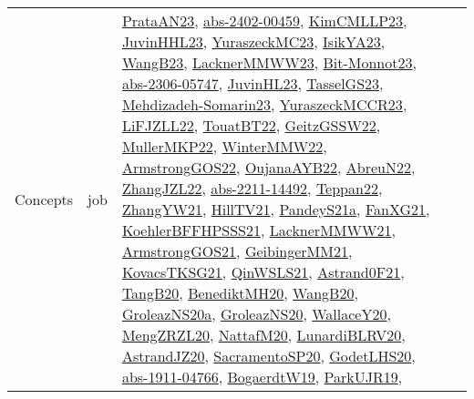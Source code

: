 {\begin{longtable}{lp{3cm}>{\raggedright}p{6cm}>{\raggedright}p{6cm}p{8cm}}
Concepts & job & \href{articles/PrataAN23.pdf}{PrataAN23}\cite{PrataAN23}, \href{articles/abs-2402-00459.pdf}{abs-2402-00459}\cite{abs-2402-00459}, \href{papers/KimCMLLP23.pdf}{KimCMLLP23}\cite{KimCMLLP23}, \href{papers/JuvinHHL23.pdf}{JuvinHHL23}\cite{JuvinHHL23}, \href{papers/YuraszeckMC23.pdf}{YuraszeckMC23}\cite{YuraszeckMC23}, \href{articles/IsikYA23.pdf}{IsikYA23}\cite{IsikYA23}, \href{papers/WangB23.pdf}{WangB23}\cite{WangB23}, \href{articles/LacknerMMWW23.pdf}{LacknerMMWW23}\cite{LacknerMMWW23}, \href{papers/Bit-Monnot23.pdf}{Bit-Monnot23}\cite{Bit-Monnot23}, \href{articles/abs-2306-05747.pdf}{abs-2306-05747}\cite{abs-2306-05747}, \href{papers/JuvinHL23.pdf}{JuvinHL23}\cite{JuvinHL23}, \href{papers/TasselGS23.pdf}{TasselGS23}\cite{TasselGS23}, \href{papers/Mehdizadeh-Somarin23.pdf}{Mehdizadeh-Somarin23}\cite{Mehdizadeh-Somarin23}, \href{articles/YuraszeckMCCR23.pdf}{YuraszeckMCCR23}\cite{YuraszeckMCCR23}, \href{papers/LiFJZLL22.pdf}{LiFJZLL22}\cite{LiFJZLL22}, \href{papers/TouatBT22.pdf}{TouatBT22}\cite{TouatBT22}, \href{papers/GeitzGSSW22.pdf}{GeitzGSSW22}\cite{GeitzGSSW22}, \href{articles/MullerMKP22.pdf}{MullerMKP22}\cite{MullerMKP22}, \href{papers/WinterMMW22.pdf}{WinterMMW22}\cite{WinterMMW22}, \href{papers/ArmstrongGOS22.pdf}{ArmstrongGOS22}\cite{ArmstrongGOS22}, \href{papers/OujanaAYB22.pdf}{OujanaAYB22}\cite{OujanaAYB22}, \href{articles/AbreuN22.pdf}{AbreuN22}\cite{AbreuN22}, \href{papers/ZhangJZL22.pdf}{ZhangJZL22}\cite{ZhangJZL22}, \href{articles/abs-2211-14492.pdf}{abs-2211-14492}\cite{abs-2211-14492}, \href{papers/Teppan22.pdf}{Teppan22}\cite{Teppan22}, \href{articles/ZhangYW21.pdf}{ZhangYW21}\cite{ZhangYW21}, \href{papers/HillTV21.pdf}{HillTV21}\cite{HillTV21}, \href{articles/PandeyS21a.pdf}{PandeyS21a}\cite{PandeyS21a}, \href{articles/FanXG21.pdf}{FanXG21}\cite{FanXG21}, \href{articles/KoehlerBFFHPSSS21.pdf}{KoehlerBFFHPSSS21}\cite{KoehlerBFFHPSSS21}, \href{papers/LacknerMMWW21.pdf}{LacknerMMWW21}\cite{LacknerMMWW21}, \href{papers/ArmstrongGOS21.pdf}{ArmstrongGOS21}\cite{ArmstrongGOS21}, \href{papers/GeibingerMM21.pdf}{GeibingerMM21}\cite{GeibingerMM21}, \href{papers/KovacsTKSG21.pdf}{KovacsTKSG21}\cite{KovacsTKSG21}, \href{articles/QinWSLS21.pdf}{QinWSLS21}\cite{QinWSLS21}, \href{papers/Astrand0F21.pdf}{Astrand0F21}\cite{Astrand0F21}, \href{papers/TangB20.pdf}{TangB20}\cite{TangB20}, \href{articles/BenediktMH20.pdf}{BenediktMH20}\cite{BenediktMH20}, \href{papers/WangB20.pdf}{WangB20}\cite{WangB20}, \href{papers/GroleazNS20a.pdf}{GroleazNS20a}\cite{GroleazNS20a}, \href{papers/GroleazNS20.pdf}{GroleazNS20}\cite{GroleazNS20}, \href{articles/WallaceY20.pdf}{WallaceY20}\cite{WallaceY20}, \href{articles/MengZRZL20.pdf}{MengZRZL20}\cite{MengZRZL20}, \href{papers/NattafM20.pdf}{NattafM20}\cite{NattafM20}, \href{articles/LunardiBLRV20.pdf}{LunardiBLRV20}\cite{LunardiBLRV20}, \href{articles/AstrandJZ20.pdf}{AstrandJZ20}\cite{AstrandJZ20}, \href{articles/SacramentoSP20.pdf}{SacramentoSP20}\cite{SacramentoSP20}, \href{papers/GodetLHS20.pdf}{GodetLHS20}\cite{GodetLHS20}, \href{articles/abs-1911-04766.pdf}{abs-1911-04766}\cite{abs-1911-04766}, \href{papers/BogaerdtW19.pdf}{BogaerdtW19}\cite{BogaerdtW19}, \href{papers/ParkUJR19.pdf}{ParkUJR19}\cite{ParkUJR19}, 
\end{longtable}}
